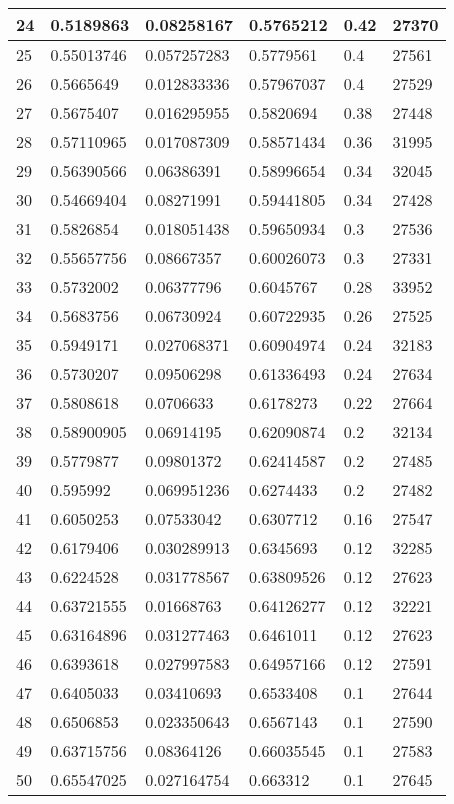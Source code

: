 \begin{longtable}{|l|l|l|l|l|l|}
24 & 0.5189863 & 0.08258167 & 0.5765212 & 0.42 & 27370 \\ \hline 
25 & 0.55013746 & 0.057257283 & 0.5779561 & 0.4 & 27561 \\ \hline 
26 & 0.5665649 & 0.012833336 & 0.57967037 & 0.4 & 27529 \\ \hline 
27 & 0.5675407 & 0.016295955 & 0.5820694 & 0.38 & 27448 \\ \hline 
28 & 0.57110965 & 0.017087309 & 0.58571434 & 0.36 & 31995 \\ \hline 
29 & 0.56390566 & 0.06386391 & 0.58996654 & 0.34 & 32045 \\ \hline 
30 & 0.54669404 & 0.08271991 & 0.59441805 & 0.34 & 27428 \\ \hline 
31 & 0.5826854 & 0.018051438 & 0.59650934 & 0.3 & 27536 \\ \hline 
32 & 0.55657756 & 0.08667357 & 0.60026073 & 0.3 & 27331 \\ \hline 
33 & 0.5732002 & 0.06377796 & 0.6045767 & 0.28 & 33952 \\ \hline 
34 & 0.5683756 & 0.06730924 & 0.60722935 & 0.26 & 27525 \\ \hline 
35 & 0.5949171 & 0.027068371 & 0.60904974 & 0.24 & 32183 \\ \hline 
36 & 0.5730207 & 0.09506298 & 0.61336493 & 0.24 & 27634 \\ \hline 
37 & 0.5808618 & 0.0706633 & 0.6178273 & 0.22 & 27664 \\ \hline 
38 & 0.58900905 & 0.06914195 & 0.62090874 & 0.2 & 32134 \\ \hline 
39 & 0.5779877 & 0.09801372 & 0.62414587 & 0.2 & 27485 \\ \hline 
40 & 0.595992 & 0.069951236 & 0.6274433 & 0.2 & 27482 \\ \hline 
41 & 0.6050253 & 0.07533042 & 0.6307712 & 0.16 & 27547 \\ \hline 
42 & 0.6179406 & 0.030289913 & 0.6345693 & 0.12 & 32285 \\ \hline 
43 & 0.6224528 & 0.031778567 & 0.63809526 & 0.12 & 27623 \\ \hline 
44 & 0.63721555 & 0.01668763 & 0.64126277 & 0.12 & 32221 \\ \hline 
45 & 0.63164896 & 0.031277463 & 0.6461011 & 0.12 & 27623 \\ \hline 
46 & 0.6393618 & 0.027997583 & 0.64957166 & 0.12 & 27591 \\ \hline 
47 & 0.6405033 & 0.03410693 & 0.6533408 & 0.1 & 27644 \\ \hline 
48 & 0.6506853 & 0.023350643 & 0.6567143 & 0.1 & 27590 \\ \hline 
49 & 0.63715756 & 0.08364126 & 0.66035545 & 0.1 & 27583 \\ \hline 
50 & 0.65547025 & 0.027164754 & 0.663312 & 0.1 & 27645 \\ \hline 
\end{longtable}
